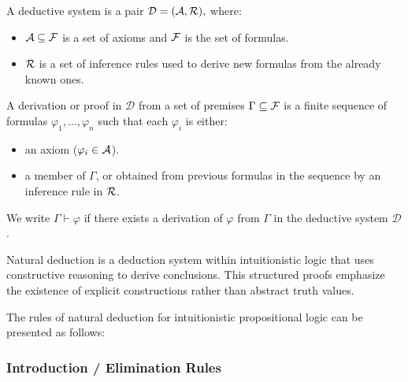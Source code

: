 \begin{definition} A deductive system is a pair
\(
\mathcal{D} = (\mathcal{A}, \mathcal{R}),
\)
where:
\begin{itemize}
    \item $\mathcal{A} \subseteq \mathcal{F}$ is a set of axioms and $\mathcal{F}$ is the set of formulas.
    \item $\mathcal{R}$ is a set of inference rules used to derive new formulas from the already known ones.
\end{itemize}
A derivation or proof in $\mathcal{D}$ from a set of premises $\Gamma \subseteq \mathcal{F}$ is a finite sequence of formulas
\(
\varphi_1, \dots, \varphi_n
\)
such that each $\varphi_i$ is either:
\begin{itemize}
    \item an axiom ($\varphi_i \in \mathcal{A}$).
    \item a member of $\Gamma$, or obtained from previous formulas in the sequence by an inference rule in $\mathcal{R}$.
\end{itemize}
We write
\(
\Gamma \vdash \varphi
\)
if there exists a derivation of $\varphi$ from $\Gamma$ in the deductive system $\mathcal{D}$.
\end{definition}
Natural deduction is a deduction system within intuitionistic logic that uses constructive reasoning to derive conclusions. This structured proofs emphasize the existence of explicit constructions rather than abstract truth values.

The rules of natural deduction for intuitionistic propositional logic can be presented as follows:
\subsubsection{\centering Introduction / Elimination Rules}

\medskip

